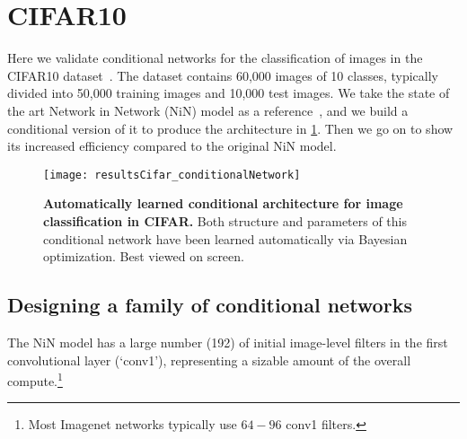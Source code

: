 \documentclass[thesis]{subfiles}
\begin{document}
	
	\section{CIFAR10}
	Here we validate conditional networks for the classification of images in the CIFAR10 dataset~\citep{CIFAR10}. 
	The dataset contains 60,000 images of 10 classes, typically divided into 50,000 training images and 10,000 test images. 
	We take the state of the art Network in Network (NiN) model 
	as a reference~\citep{Lin2013NiN}, and we build a conditional version of it to produce the architecture in \cref{fig:Cifar_CondNet}. 
	Then we go on to show its increased efficiency compared to the original NiN model.
	
	\begin{figure}[tbp]
		\centerline{
			\texttt{[image: resultsCifar\_conditionalNetwork]}
		}
		\caption[Automatically learned conditional architecture for CIFAR.]{{\bf Automatically learned conditional architecture for image classification in CIFAR.} Both structure and parameters of this conditional network have been learned automatically via Bayesian optimization.
			Best viewed on screen.}
		\label{fig:Cifar_CondNet}
	\end{figure}
	
	\subsection{Designing a family of conditional networks}
	The NiN model has a large number (192) of initial image-level filters in the first convolutional layer (`conv1'), 
	representing a sizable amount of the overall compute.\footnote{Most Imagenet networks typically use $64-96$ conv1 filters.}
	
\end{document}
